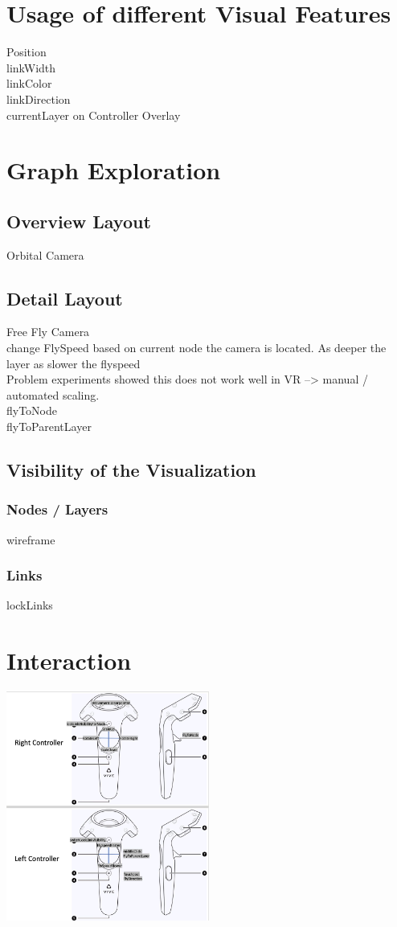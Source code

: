 \section{Usage of different Visual Features}

Position \\
linkWidth \\
linkColor \\
linkDirection \\ 
currentLayer on Controller Overlay \\ 

\section{Graph Exploration}

\subsection{Overview Layout}
Orbital Camera

\subsection{Detail Layout}
Free Fly Camera \\
change FlySpeed based on current node the camera is located. As deeper the layer as slower the flyspeed \\
Problem experiments showed this does not work well in VR --> manual / automated scaling. \\

flyToNode \\
flyToParentLayer \\

\subsection{Visibility of the Visualization}
\subsubsection{Nodes / Layers}
wireframe
\subsubsection{Links}
lockLinks

\section{Interaction}
\includegraphics[width=0.5\textwidth]{chapters/graphics/controllerMapping.jpg}
